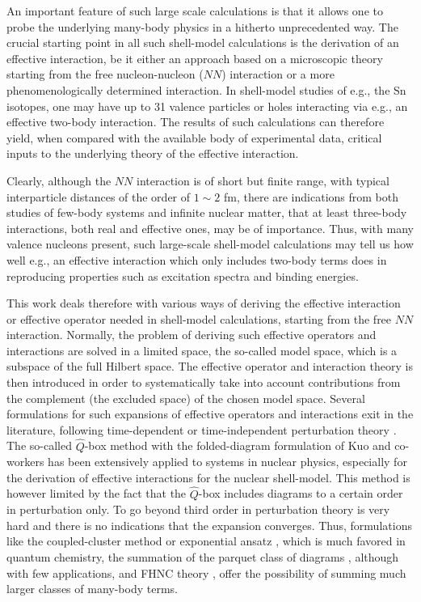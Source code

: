 \documentclass{article}
\begin{document}
An important feature of such large scale calculations
is that it allows one to probe the underlying many-body
physics in a hitherto unprecedented way.
The crucial starting point in all such shell-model
calculations is
the derivation of an effective interaction, be it
either an approach based on a microscopic theory
starting from the free nucleon-nucleon ($NN$) interaction or a more
phenomenologically determined interaction.
In shell-model studies of e.g., the Sn isotopes, one may have
up to 31 valence particles or holes interacting via e.g.,
an effective two-body interaction. The results of such
calculations can therefore yield, when compared with
the available body of experimental data, critical
inputs to the underlying theory of the effective interaction.

Clearly, although the $NN$  interaction is of short
but finite range, with typical interparticle
distances of the order of $1\sim 2$ fm, there are
indications from both studies of few-body systems and
infinite nuclear matter, that at least three-body
interactions, both real and effective ones, may be of
importance.
Thus, with many valence nucleons present, such
large-scale shell-model calculations may
tell us how well e.g., an effective interaction
which only includes two-body terms does in
reproducing properties such as excitation spectra and
binding energies.

This work deals therefore with various ways of
deriving the effective
interaction or effective operator needed
in shell-model calculations, starting from the
free $NN$  interaction.
Normally, the problem of deriving such effective operators and interactions are solved
in a limited space, the so-called model space, which is a subspace of the
full Hilbert space. The effective operator and interaction
theory is then introduced in order to
systematically take into account contributions from the complement
(the excluded space) of the chosen model space. Several formulations
for such expansions of effective operators and interactions exit in the literature, following
time-dependent or time-independent
perturbation theory \cite{so95,brandow67,ko90,hko95,lm85,so84}.
The so-called $\hat{Q}$-box method with the folded-diagram
formulation of Kuo and co-workers \cite{ko90,hko95} has been extensively
applied to systems in nuclear physics, especially for the derivation of
effective interactions for the nuclear shell-model. This method is however limited 
by the fact that the $\hat{Q}$-box includes diagrams to a certain order in perturbation only.
To go beyond third order in perturbation theory is very hard and there is no indications
that the expansion converges. Thus,
formulations like the coupled-cluster
method or exponential ansatz
\cite{lm85,coester58,coester60,bartlett81,comp_chem_rev00,harris92,piotr1,helgaker,arponen97,lk72a,lk72b,zabolitzky74,klz78,ticcm,mh00a,mh00b,mh99,hm99}, which is  much favored
in quantum chemistry,
the summation of the parquet class of diagrams
\cite{dm64,nozieres,babu,jls82,br86,scalapino,ym96,dya97}, although with few applications, and FHNC
theory \cite{br86,adelchi98,apr98}, 
offer the possibility of summing much larger classes of many-body terms. 
\end{document}
